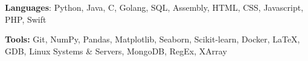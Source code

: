 \documentclass{article}
\begin{document}
    


    \begin{adjustwidth}{1em}{1em}
        
        \textbf{Languages}: Python, Java, C, Golang, SQL, Assembly, HTML, CSS, Javascript, PHP, Swift
    
        \vspace{1mm}

        \textbf{Tools:} Git, NumPy, Pandas, Matplotlib, Seaborn, Scikit-learn, Docker, \LaTeX, GDB, Linux Systems \& Servers, MongoDB, RegEx, XArray

    \end{adjustwidth}

    
\end{document}
